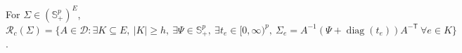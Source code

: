 For \(\Sigma\in(\mathbb S_{+}^{p})^{E}\), \(\mathcal R_c(\Sigma)=\{A\in\mathcal D:\exists K\subseteq E,\ |K|\ge h,\ \exists\Psi\in\mathbb S_{+}^p,\ \exists t_e\in[0,\infty)^p,\ \Sigma_e=A^{-1}(\Psi+\operatorname{diag}(t_e))A^{-\mathsf T}\ \forall e\in K\}\).